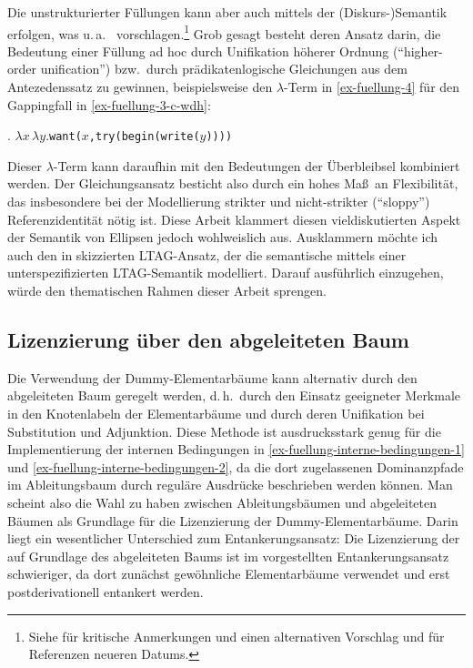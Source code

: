 Die  unstrukturierter Füllungen kann aber auch mittels der (Diskurs-)Seman\-tik erfolgen, was u.\,a.\ \cite{Dalrymple:etal:91}  vorschlagen.\footnote{Siehe \citet[68f]{Hardt:93} für kritische Anmerkungen und einen alternativen Vorschlag und \cite{Winkler:Schwabe:03} für Referenzen neueren Datums.} Grob gesagt besteht deren Ansatz darin, die Bedeutung einer Füllung ad hoc durch Unifikation höherer Ordnung ("`higher-order unification"') bzw.\ durch prädikatenlogische Gleichungen aus dem Antezedenssatz zu gewinnen, beispielsweise den $\lambda$-Term in \ref{ex-fuellung-4} für den Gappingfall in \ref{ex-fuellung-3-c-wdh}:

\ex. \label{ex-fuellung-4}$\lambda x \, \lambda y. ${\tt want($x$,try(begin(write($y$))))}   

\largerpage
Dieser $\lambda$-Term kann daraufhin mit den Bedeutungen der Überbleibsel kombiniert werden. Der Gleichungsansatz besticht also durch ein hohes Ma\ss\ an Flexibilität, das insbesondere bei der Modellierung strikter und nicht-strikter ("`sloppy"') Referenzidentität nötig ist. Diese Arbeit klammert diesen vieldiskutierten Aspekt der Semantik von Ellipsen jedoch wohlweislich aus. Ausklammern möchte ich auch den in \cite{Babko-Malaya:06} skizzierten LTAG-Ansatz, der die semantische  mittels einer unterspezifizierten LTAG-Semantik modelliert. Darauf ausführlich einzugehen, würde den thematischen Rahmen dieser Arbeit sprengen.

\subsection{Lizenzierung über den abgeleiteten Baum}

Die Verwendung der Dummy-Elementarbäume kann alternativ durch den abgeleiteten Baum geregelt werden, d.\,h.\ durch den Einsatz geeigneter Merkmale in den Knotenlabeln der Elementarbäume und durch deren Unifikation bei Substitution und Adjunktion. Diese Methode ist ausdrucksstark genug für die Implementierung der internen Bedingungen in \ref{ex-fuellung-interne-bedingungen-1} und \ref{ex-fuellung-interne-bedingungen-2}, da die dort zugelassenen Dominanzpfade im Ableitungsbaum durch reguläre Ausdrücke beschrieben werden können. 
Man scheint also die Wahl zu haben zwischen Ableitungsbäumen und abgeleiteten Bäumen als Grundlage für die Lizenzierung der Dummy-Elementarbäume. Darin liegt ein wesentlicher Unterschied zum Entankerungsansatz: Die Lizenzierung der  auf Grundlage des abgeleiteten Baums ist im vorgestellten Entankerungsansatz schwieriger, da dort zunächst gewöhnliche Elementarbäume verwendet und erst postderivationell entankert werden.

